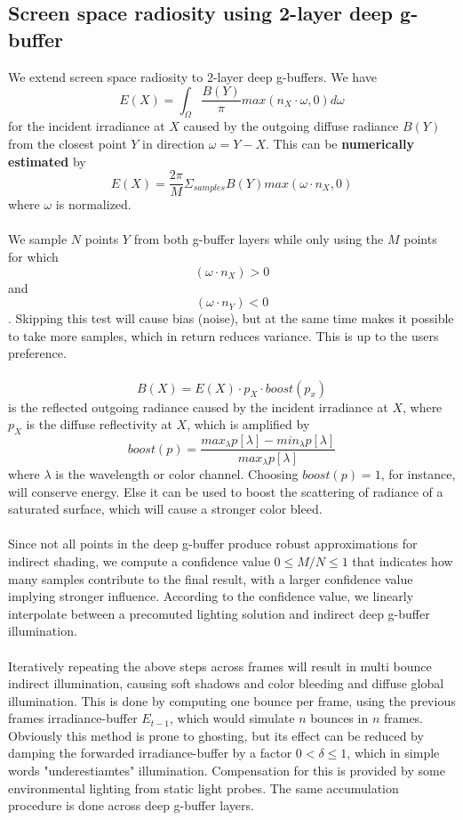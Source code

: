 \documentclass{ACGSeminar}
\begin{document}
	\subsection{Screen space radiosity using 2-layer deep g-buffer}
		We extend screen space radiosity \cite{RTAII} to 2-layer deep g-buffers. We have 
		$$ E(X) = \int_{\Omega} \frac{B(Y)}{\pi} max(n_X \cdot \omega, 0) d\omega$$
		for the incident irradiance at $X$ caused by the outgoing diffuse radiance $B(Y)$ from the closest point $Y$ in direction $\omega = Y - X$. This can be \textbf{numerically estimated} by
		$$ E(X) = \frac{2\pi}{M} \Sigma_{samples} B(Y) max(\omega \cdot n_X, 0)$$
		where $\omega$ is normalized. \\\\
		We sample $N$ points $Y$ from both g-buffer layers while only using the $M$ points for which
		$$ (\omega \cdot n_X) > 0 $$
		and
		$$ (\omega \cdot n_Y) < 0 $$. Skipping this test will cause bias (noise), but at the same time makes it possible to take more samples, which in return reduces variance. This is up to the users preference. \\\\
		$$ B(X) = E(X) \cdot p_X \cdot boost(p_x) $$
		is the reflected outgoing radiance caused by the incident irradiance at $X$, where $p_X$ is the diffuse reflectivity at $X$, which is amplified by 
		$$ boost(p) = \frac{max_{\lambda}p[\lambda] - min_{\lambda}p[\lambda]}{max_{\lambda}p[\lambda]} $$ 
		where $\lambda$ is the wavelength or color channel. Choosing $boost(p) = 1$, for instance, will conserve energy. Else it can be used to boost the scattering of radiance of a saturated surface, which will cause a stronger color bleed. \\\\
		Since not all points in the deep g-buffer produce robust approximations for indirect shading, we compute a confidence value $0 \leq M/N \leq 1$ that indicates how many samples contribute to the final result, with a larger confidence value implying stronger influence. According to the confidence value, we linearly interpolate between a precomuted lighting solution and indirect deep g-buffer illumination. \\\\
		Iteratively repeating the above steps across frames will result in multi bounce indirect illumination, causing soft shadows and color bleeding and diffuse global illumination. This is done by computing one bounce per frame, using the previous frames irradiance-buffer $E_{t-1}$, which would simulate $n$ bounces in $n$ frames. Obviously this method is prone to ghosting, but its effect can be reduced by damping the forwarded irradiance-buffer by a factor $0 < \delta \leq 1$, which in simple words "underestiamtes" illumination. Compensation for this is provided by some environmental lighting from static light probes. The same accumulation procedure is done across deep g-buffer layers. \\\\
\end{document}
